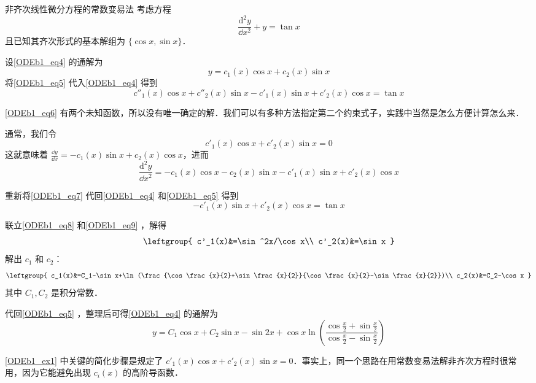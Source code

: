 \begin{example}{非齐次线性微分方程的常数变易法}\label{ODEb1_ex1}
考虑方程
\begin{equation}\label{ODEb1_eq4}
\frac{\mathrm{d}^2 y}{\dd x^2}+y=\tan x
\end{equation}
且已知其齐次形式的基本解组为 $\{\cos x, \sin x\}$．

设\autoref{ODEb1_eq4} 的通解为
\begin{equation}\label{ODEb1_eq5}
y=c_1(x)\cos x+c_2(x)\sin x
\end{equation}
将\autoref{ODEb1_eq5} 代入\autoref{ODEb1_eq4} 得到
\begin{equation}\label{ODEb1_eq6}
c''_1(x)\cos x+c''_2(x)\sin x-c'_1(x)\sin x+c'_2(x)\cos x=\tan x
\end{equation}

\autoref{ODEb1_eq6} 有两个未知函数，所以没有唯一确定的解．我们可以有多种方法指定第二个约束式子，实践中当然是怎么方便计算怎么来．

通常，我们令
\begin{equation}\label{ODEb1_eq8}
c'_1(x)\cos x+c'_2(x)\sin x=0
\end{equation}
这就意味着 $\frac{\dd y}{\dd x}=-c_1(x)\sin x+c_2(x)\cos x$，进而
\begin{equation}\label{ODEb1_eq7}
\frac{\mathrm{d}^2 y}{\dd x^2}=-c_1(x)\cos x-c_2(x)\sin x-c'_1(x)\sin x+c'_2(x)\cos x
\end{equation}

重新将\autoref{ODEb1_eq7} 代回\autoref{ODEb1_eq4} 和\autoref{ODEb1_eq5} 得到
\begin{equation}\label{ODEb1_eq9}
-c'_1(x)\sin x+c'_2(x)\cos x=\tan x
\end{equation}

联立\autoref{ODEb1_eq8} 和\autoref{ODEb1_eq9} ，解得
\begin{equation}
\leftgroup{
c'_1(x)&=\sin^2x/\cos x\\
c'_2(x)&=\sin x
}
\end{equation}
解出 $c_1$ 和 $c_2$：
\begin{equation}
\leftgroup{
    c_1(x)&=C_1-\sin x+\ln(\frac{\cos\frac{x}{2}+\sin\frac{x}{2}}{\cos\frac{x}{2}-\sin\frac{x}{2}})\\
    c_2(x)&=C_2-\cos x
}
\end{equation}
其中 $C_1, C_2$ 是积分常数．

代回\autoref{ODEb1_eq5} ，整理后可得\autoref{ODEb1_eq4} 的通解为
\begin{equation}
y=C_1\cos x+C_2\sin x-\sin 2x+\cos x\ln(\frac{\cos\frac{x}{2}+\sin\frac{x}{2}}{\cos\frac{x}{2}-\sin\frac{x}{2}})
\end{equation}




\end{example}


\autoref{ODEb1_ex1} 中关键的简化步骤是规定了 $c'_1(x)\cos x+c'_2(x)\sin x=0$．事实上，同一个思路在用常数变易法解非齐次方程时很常用，因为它能避免出现 $c_i(x)$ 的高阶导函数．
















